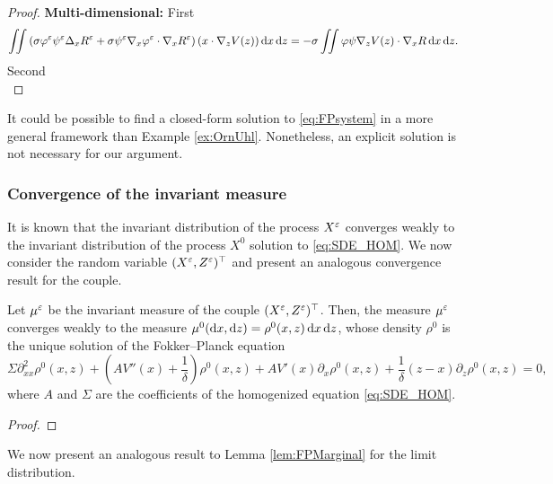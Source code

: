 \documentclass[10pt]{article}
\begin{document}
\begin{proof}
\textbf{Multi-dimensional:} First
\begin{equation}
	\iint \left(\sigma \varphi^\varepsilon \psi^\varepsilon \Delta_x R^\varepsilon + \sigma \psi^\varepsilon \nabla_x\varphi^\varepsilon \cdot \nabla_x R^\varepsilon\right)(x \cdot \nabla_z V(z)) \,\mathrm{d} x \,\mathrm{d} z = -\sigma \iint \varphi\psi \nabla_z V(z) \cdot \nabla_x R \,\mathrm{d} x \,\mathrm{d} z.
\end{equation}
Second
\begin{equation}
	
\end{equation}
\end{proof}

\begin{remark} It could be possible to find a closed-form solution to \eqref{eq:FPsystem} in a more general framework than Example \ref{ex:OrnUhl}. Nonetheless, an explicit solution is not necessary for our argument.
\end{remark}

\subsubsection{Convergence of the invariant measure}\label{sec:convMeasure}

It is known that the invariant distribution of the process $X^\varepsilon$ converges weakly to the invariant distribution of the process $X^0$ solution to \eqref{eq:SDE_HOM}. We now consider the random variable $(X^\varepsilon, Z^\varepsilon)^\top$ and present an analogous convergence result for the couple.

\begin{lemma}\label{lem:convMeasure} Let $\mu^\varepsilon$ be the invariant measure of the couple $(X^\varepsilon, Z^\varepsilon)^\top$. Then, the measure $\mu^\varepsilon$ converges weakly to the measure $\mu^0(\mathrm{d} x, \mathrm{d} z) = \rho^0(x, z) \,\mathrm{d} x \,\mathrm{d} z$, whose density $\rho^0$ is the unique solution of the Fokker--Planck equation
\begin{equation} \label{eq:FPsystem_homogenized}
	\Sigma \partial^2_{xx} \rho^0(x,z) + \left ( A V''(x) + \frac{1}{\delta} \right ) \rho^0(x,z) + A V'(x) \partial_x \rho^0(x,z) + \frac{1}{\delta}(z - x) \partial_z \rho^0(x,z) = 0,
\end{equation}
where $A$ and $\Sigma$ are the coefficients of the homogenized equation \eqref{eq:SDE_HOM}.
\end{lemma}
\begin{proof} 
\end{proof}

We now present an analogous result to Lemma \ref{lem:FPMarginal} for the limit distribution.
\end{document}
